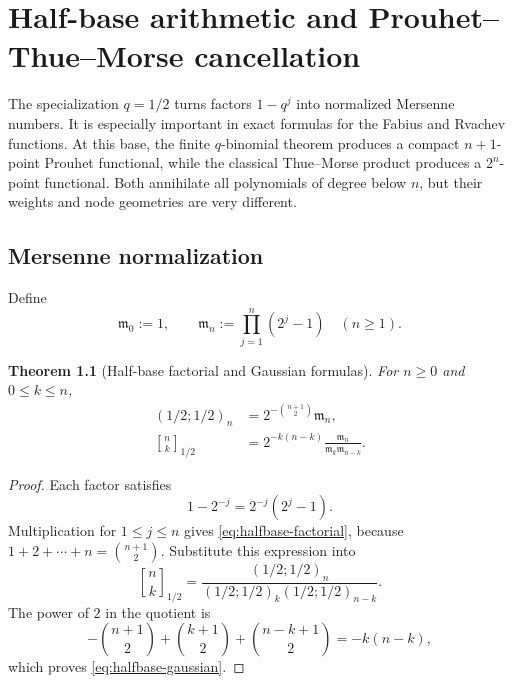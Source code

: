 \documentclass[11pt,oneside,openany]{book}
\newtheorem{theorem}{Theorem}[chapter]
\theoremstyle{definition}
\theoremstyle{remark}
\newcommand{\Qbinom}[3]{\genfrac{[}{]}{0pt}{}{#1}{#2}_{#3}}
\begin{document}
\chapter{Half-base arithmetic and Prouhet--Thue--Morse cancellation}\label{chap:halfbase-thuemorse}

The specialization $q=1/2$ turns factors $1-q^j$ into normalized Mersenne numbers.  It is especially important in exact formulas for the Fabius and Rvachev functions.  At this base, the finite $q$-binomial theorem produces a compact $n+1$-point Prouhet functional, while the classical Thue--Morse product produces a $2^n$-point functional.  Both annihilate all polynomials of degree below $n$, but their weights and node geometries are very different.

\section{Mersenne normalization}

Define
\begin{equation}\label{eq:mersenne-product}
 \mathfrak m_0:=1,
 \qquad
 \mathfrak m_n:=\prod_{j=1}^{n}(2^j-1)
 \quad(n\ge1).
\end{equation}

\begin{theorem}[Half-base factorial and Gaussian formulas]\label{thm:halfbase-normalization}
For $n\ge0$ and $0\le k\le n$,
\begin{align}
 (1/2;1/2)_n
 &=2^{-\binom{n+1}{2}}\mathfrak m_n,
 \label{eq:halfbase-factorial}\\
 \Qbinom nk{1/2}
 &=2^{-k(n-k)}
   \frac{\mathfrak m_n}{\mathfrak m_k\mathfrak m_{n-k}}.
 \label{eq:halfbase-gaussian}
\end{align}
\end{theorem}

\begin{proof}
Each factor satisfies
\[
 1-2^{-j}=2^{-j}(2^j-1).
\]
Multiplication for $1\le j\le n$ gives \eqref{eq:halfbase-factorial}, because
$1+2+\cdots+n=\binom{n+1}{2}$.  Substitute this expression into
\[
 \Qbinom nk{1/2}
 =\frac{(1/2;1/2)_n}{(1/2;1/2)_k(1/2;1/2)_{n-k}}.
\]
The power of $2$ in the quotient is
\[
 -\binom{n+1}{2}+\binom{k+1}{2}+\binom{n-k+1}{2}
 =-k(n-k),
\]
which proves \eqref{eq:halfbase-gaussian}.
\end{proof}
\end{document}
